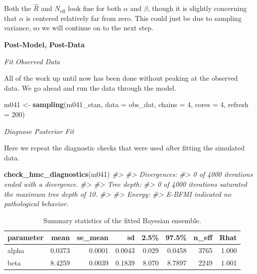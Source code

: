 \documentclass[11pt, oneside, openany]{scrbook}
\newenvironment{Shaded}{\begin{snugshade}}{\end{snugshade}}
\newcommand{\CommentTok}[1]{\textcolor[rgb]{0.56,0.35,0.01}{\textit{#1}}}
\newcommand{\DataTypeTok}[1]{\textcolor[rgb]{0.13,0.29,0.53}{#1}}
\newcommand{\DecValTok}[1]{\textcolor[rgb]{0.00,0.00,0.81}{#1}}
\newcommand{\KeywordTok}[1]{\textcolor[rgb]{0.13,0.29,0.53}{\textbf{#1}}}
\newcommand{\NormalTok}[1]{#1}
\newcommand{\StringTok}[1]{\textcolor[rgb]{0.31,0.60,0.02}{#1}}
\begin{document}
Both the \(\hat{R}\) and \(N_{\mathrm{eff}}\) look fine for both \(\alpha\) and \(\beta\), though it is slightly concerning that \(\alpha\) is centered relatively far from zero. This could just be due to sampling variance, so we will continue on to the next step.

\textbf{Post-Model, Post-Data}

\emph{Fit Observed Data}

All of the work up until now has been done without peaking at the observed data. We go ahead and run the data through the model.


\begin{Shaded}
\begin{Highlighting}[]
\NormalTok{m041 <-}\StringTok{ }\KeywordTok{sampling}\NormalTok{(m041_stan, }\DataTypeTok{data =}\NormalTok{ obs_dat, }
                 \DataTypeTok{chains =} \DecValTok{4}\NormalTok{, }\DataTypeTok{cores =} \DecValTok{4}\NormalTok{, }\DataTypeTok{refresh =} \DecValTok{200}\NormalTok{)}
\end{Highlighting}
\end{Shaded}


\emph{Diagnose Posterior Fit}

Here we repeat the diagnostic checks that were used after fitting the simulated data.


\begin{Shaded}
\begin{Highlighting}[]
\KeywordTok{check_hmc_diagnostics}\NormalTok{(m041)}
\CommentTok{#> }
\CommentTok{#> Divergences:}
\CommentTok{#> 0 of 4000 iterations ended with a divergence.}
\CommentTok{#> }
\CommentTok{#> Tree depth:}
\CommentTok{#> 0 of 4000 iterations saturated the maximum tree depth of 10.}
\CommentTok{#> }
\CommentTok{#> Energy:}
\CommentTok{#> E-BFMI indicated no pathological behavior.}
\end{Highlighting}
\end{Shaded}


\begin{table}[!h]

\caption{\label{tab:ch041-Maroon-Oyster}Summary statistics of the fitted Bayesian ensemble.}
\centering
\begin{tabular}[t]{lrrrrrrr}
\toprule
parameter & mean & se\_mean & sd & 2.5\% & 97.5\% & n\_eff & Rhat\\
\midrule
alpha & 0.0373 & 0.0001 & 0.0043 & 0.029 & 0.0458 & 3765 & 1.000\\
beta & 8.4259 & 0.0039 & 0.1839 & 8.070 & 8.7897 & 2249 & 1.001\\
\bottomrule
\end{tabular}
\end{table}
\end{document}

